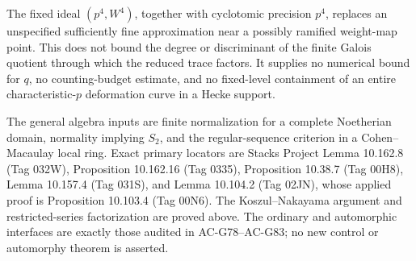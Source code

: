 \begin{remark}
\label{rem:G84-scope}
The fixed ideal \((p^4,W^4)\), together with cyclotomic precision
\(p^4\), replaces an unspecified sufficiently fine approximation
near a possibly ramified weight-map point.
This does not bound the degree or discriminant of the finite
Galois quotient through which the reduced trace factors.
It supplies no numerical bound for \(q\), no counting-budget
estimate, and no fixed-level containment of an entire
characteristic-\(p\) deformation curve in a Hecke support.

The general algebra inputs are finite normalization for a
complete Noetherian domain, normality implying \(S_2\), and the
regular-sequence criterion in a Cohen--Macaulay local ring.
Exact primary locators are Stacks Project Lemma 10.162.8
(Tag 032W), Proposition 10.162.16 (Tag 0335), Proposition 10.38.7 (Tag 00H8), Lemma 10.157.4
(Tag 031S), and Lemma 10.104.2 (Tag 02JN), whose applied proof
is Proposition 10.103.4 (Tag 00N6).
The Koszul--Nakayama argument and restricted-series factorization
are proved above. The ordinary and automorphic interfaces are
exactly those audited in AC-G78--AC-G83; no new control or
automorphy theorem is asserted.
\end{remark}
